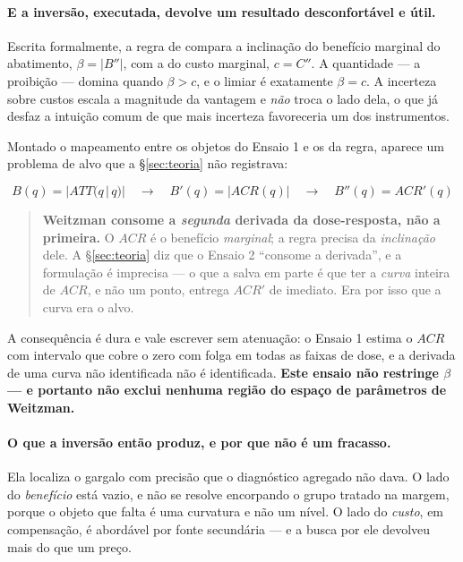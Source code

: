 \paragraph{E a inversão, executada, devolve um resultado desconfortável e útil.}
Escrita formalmente, a regra de \citet{weitzman1974} compara a inclinação do
benefício marginal do abatimento, \(\beta = |B''|\), com a do custo marginal,
\(c = C''\). A quantidade --- a proibição --- domina quando \(\beta > c\), e o
limiar é exatamente \(\beta = c\). A incerteza sobre custos escala a magnitude da
vantagem e \emph{não} troca o lado dela, o que já desfaz a intuição comum de que
mais incerteza favoreceria um dos instrumentos.

Montado o mapeamento entre os objetos do Ensaio 1 e os da regra, aparece um
problema de alvo que a §\ref{sec:teoria} não registrava:

\[
B(q) = |ATT(q\,|\,q)| \quad\longrightarrow\quad
B'(q) = |ACR(q)| \quad\longrightarrow\quad
B''(q) = ACR'(q)
\]

\begin{quote}
\textbf{Weitzman consome a \emph{segunda} derivada da dose-resposta, não a
primeira.} O \(ACR\) é o benefício \emph{marginal}; a regra precisa da
\emph{inclinação} dele. A §\ref{sec:teoria} diz que o Ensaio 2 ``consome a
derivada'', e a formulação é imprecisa --- o que a salva em parte é que ter a
\emph{curva} inteira de \(ACR\), e não um ponto, entrega \(ACR'\) de imediato.
Era por isso que a curva era o alvo.
\end{quote}

A consequência é dura e vale escrever sem atenuação: o Ensaio 1 estima o \(ACR\)
com intervalo que cobre o zero com folga em todas as faixas de dose, e a derivada
de uma curva não identificada não é identificada. \textbf{Este ensaio não
restringe \(\beta\) --- e portanto não exclui nenhuma região do espaço de
parâmetros de Weitzman.}

\paragraph{O que a inversão então produz, e por que não é um fracasso.}
Ela localiza o gargalo com precisão que o diagnóstico agregado não dava. O lado
do \emph{benefício} está vazio, e não se resolve encorpando o grupo tratado na
margem, porque o objeto que falta é uma curvatura e não um nível. O lado do
\emph{custo}, em compensação, é abordável por fonte secundária --- e a busca por
ele devolveu mais do que um preço.

